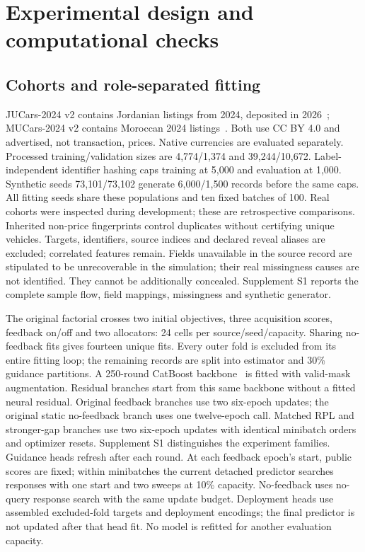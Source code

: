 \documentclass[11pt]{article}
\begin{document}
\section{Experimental design and computational checks}\label{sec:experiment_setup}
\subsection{Cohorts and role-separated fitting}
JUCars-2024 v2 contains Jordanian listings from 2024, deposited in
2026~\cite{jucarsdata}; MUCars-2024 v2 contains Moroccan 2024 listings~\cite{mucarsdata}.
Both use CC BY 4.0 and advertised, not transaction, prices. Native currencies
are evaluated separately. Processed training/validation sizes are
4,774/1,374 and 39,244/10,672. Label-independent identifier hashing caps
training at 5,000 and evaluation at 1,000. Synthetic seeds 73,101/73,102
generate 6,000/1,500 records before the same caps. All fitting seeds share
these populations and ten fixed batches of 100. Real cohorts were inspected
during development; these are retrospective comparisons. Inherited non-price
fingerprints control duplicates without certifying unique vehicles. Targets,
identifiers, source indices and declared reveal aliases are excluded; correlated
features remain. Fields unavailable in the source record are stipulated to be unrecoverable in the simulation; their real missingness causes are not identified. They cannot be additionally concealed. Supplement S1 reports the complete sample flow, field mappings, missingness and synthetic generator.

The original factorial crosses two initial objectives, three acquisition
scores, feedback on/off and two allocators: 24 cells per source/seed/capacity.
Sharing no-feedback fits gives fourteen unique fits. Every outer fold is
excluded from its entire fitting loop; the remaining records are split into
estimator and 30\% guidance partitions. A 250-round CatBoost backbone~\cite{catboost} is fitted with valid-mask augmentation. Residual branches start from this same backbone without a fitted neural residual. Original feedback branches use two six-epoch updates; the original static no-feedback branch uses one twelve-epoch call. Matched RPL and stronger-gap branches use two six-epoch updates with identical minibatch orders and optimizer resets. Supplement S1 distinguishes the experiment families. Guidance heads refresh after
each round. At each feedback epoch's start, public scores are fixed; within
minibatches the current detached predictor searches responses with one start
and two sweeps at 10\% capacity. No-feedback uses no-query response search
with the same update budget. Deployment heads use assembled excluded-fold
targets and deployment encodings; the final predictor is not updated after
that head fit. No model is refitted for another evaluation capacity.
\end{document}
